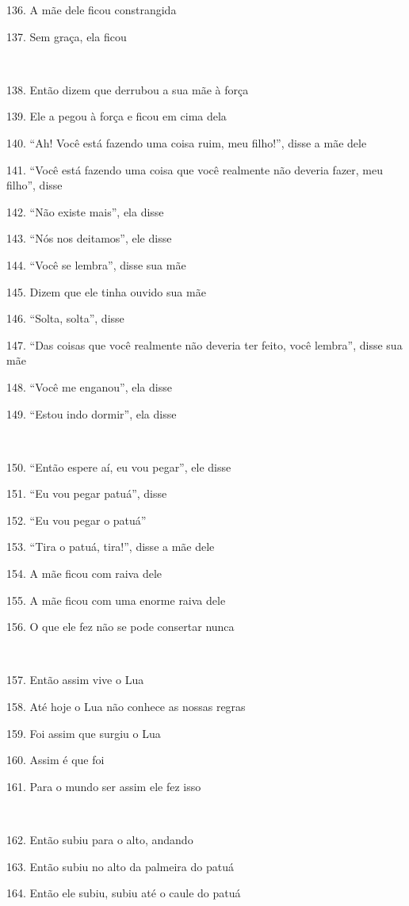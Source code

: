 136. A mãe dele ficou constrangida

137. Sem graça, ela ficou

~

138. Então dizem que derrubou a sua mãe à força

139. Ele a pegou à força e ficou em cima dela

140. ``Ah! Você está fazendo uma coisa ruim, meu filho!'', disse a mãe
dele

141. ``Você está fazendo uma coisa que você realmente não deveria fazer,
meu filho'', disse

142. ``Não existe mais'', ela disse

143. ``Nós nos deitamos'', ele disse

144. ``Você se lembra'', disse sua mãe

145. Dizem que ele tinha ouvido sua mãe

146. ``Solta, solta'', disse

147. ``Das coisas que você realmente não deveria ter feito, você
lembra'', disse sua mãe

148. ``Você me enganou'', ela disse

149. ``Estou indo dormir'', ela disse

~

150. ``Então espere aí, eu vou pegar'', ele disse

151. ``Eu vou pegar patuá'', disse

152. ``Eu vou pegar o patuá''

153. ``Tira o patuá, tira!'', disse a mãe dele

154. A mãe ficou com raiva dele

155. A mãe ficou com uma enorme raiva dele

156. O que ele fez não se pode consertar nunca

~

157. Então assim vive o Lua

158. Até hoje o Lua não conhece as nossas regras

159. Foi assim que surgiu o Lua

160. Assim é que foi

161. Para o mundo ser assim ele fez isso

~

162. Então subiu para o alto, andando

163. Então subiu no alto da palmeira do patuá

164. Então ele subiu, subiu até o caule do patuá

